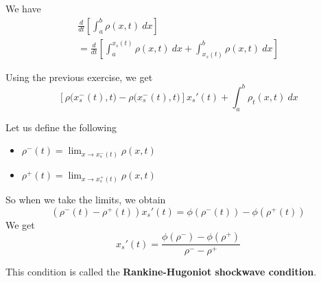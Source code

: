 \documentclass{workbook}
\begin{document}
\begin{solution}

\begin{slide}

\begin{parts}

\item We have
\begin{multline*}	
	\frac{d}{dt} \left[ \int_a^b \rho(x,t) ~dx \right] \\
		= \frac{d}{dt} \left[ \int_a^{x_s(t)} \rho(x,t) ~dx + \int_{x_s(t)}^b \rho(x,t) ~dx \right]
\end{multline*}

Using the previous exercise, we get
\[
\left[\rho\big(x_s^-(t),t\big)- \rho\big(x_s^-(t),t\big) \right] x_s'(t) + \int_a^b \rho_t(x,t) ~dx
\]

	\item Let us define the following
	\begin{itemize}
		\item $\displaystyle\rho^-(t) = \lim_{x \to x_s^-(t)} \rho(x,t)$
		\item $\displaystyle\rho^+(t) = \lim_{x \to x_s^+(t)} \rho(x,t)$
	\end{itemize}
	
	So when we take the limits, we obtain
	\[
		( \rho^-(t) - \rho^+(t)) x_s'(t) = \phi(\rho^-(t)) - \phi(\rho^+(t)) 
	\]
	We get
	\[
		x_s'(t) = \frac{\phi(\rho^-) - \phi(\rho^+)}{\rho^- - \rho^+}
	\]

	This condition is called the \textbf{Rankine-Hugoniot shockwave condition}.
\end{parts}

\end{slide}
\end{solution}
\end{document}

